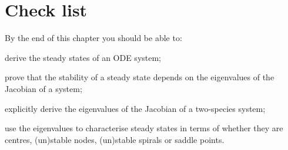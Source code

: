 \section{Check list}
By the end of this chapter you should be able to:
\begin{todolist}
\item derive the steady states of an ODE system;
\item prove that the stability of a steady state depends on the eigenvalues of the Jacobian of a system;
\item explicitly derive the eigenvalues of the Jacobian of a two-species system;
\item use the eigenvalues to characterise steady states in terms of whether they are  centres, (un)stable nodes, (un)stable spirals or saddle points.
\end{todolist}





